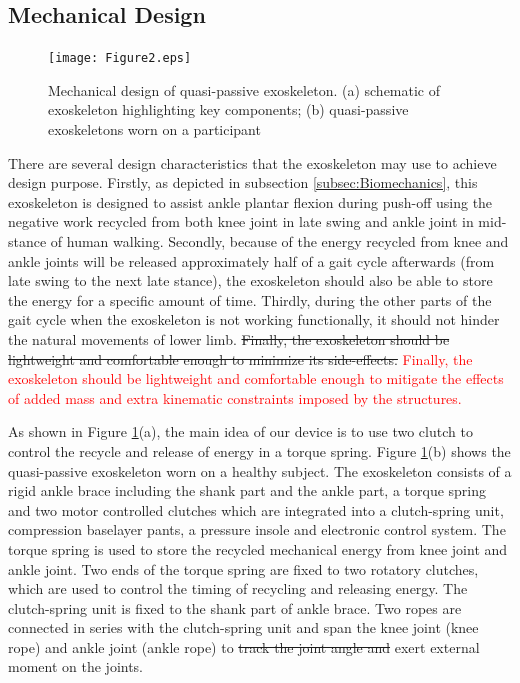 \documentclass[twocolumn,cleanfoot,10pt]{asme2ej}
\begin{document}
\subsection{Mechanical Design}

\begin{figure}[b]
	\centering
	\texttt{[image: Figure2.eps]}
	\caption{Mechanical design of quasi-passive exoskeleton. (a) schematic of exoskeleton highlighting key components; (b) quasi-passive exoskeletons worn on a participant}
	\label{fig:model}   
\end{figure}

There are several design characteristics that the exoskeleton may use to achieve design purpose. Firstly, as depicted in subsection \ref{subsec:Biomechanics}, this exoskeleton is designed to assist ankle plantar flexion during push-off using the negative work recycled from both knee joint in late swing and ankle joint in mid-stance of human walking. Secondly, because of the energy recycled from knee and ankle joints will be released approximately half of a gait cycle afterwards (from late swing to the next late stance), the exoskeleton should also be able to store the energy for a specific amount of time. Thirdly, during the other parts of the gait cycle when the exoskeleton is not working functionally, it should not hinder the natural movements of lower limb. \sout{Finally, the exoskeleton should be lightweight and comfortable enough to minimize its side-effects.} \textcolor{red}{Finally, the exoskeleton should be lightweight and comfortable enough to mitigate the effects of added mass and extra kinematic constraints imposed by the structures.}

As shown in Figure \ref{fig:model}(a), the main idea of our device is to use two clutch to control the recycle and release of energy in a torque spring. Figure \ref{fig:model}(b) shows the quasi-passive exoskeleton worn on a healthy subject. The exoskeleton consists of a rigid ankle brace including the shank part and the ankle part, a torque spring and two motor controlled clutches which are integrated into a clutch-spring unit, compression baselayer pants, a pressure insole and electronic control system. The torque spring is used to store the recycled mechanical energy from knee joint and ankle joint. Two ends of the torque spring are fixed to two rotatory clutches, which are used to control the timing of recycling and releasing energy. The clutch-spring unit is fixed to the shank part of ankle brace. Two ropes are connected in series with the clutch-spring unit and span the knee joint (knee rope) and ankle joint (ankle rope) to \sout{track the joint angle and }exert external moment on the joints. 
\end{document}

